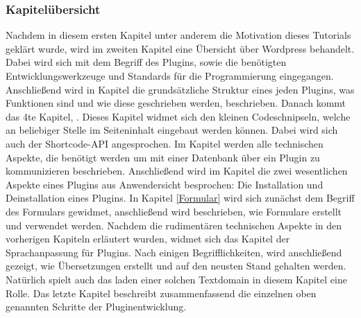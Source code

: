 \subsubsection{Kapitelübersicht}
Nachdem in diesem ersten Kapitel  unter anderem die Motivation dieses Tutorials geklärt wurde, wird im  zweiten Kapitel  eine Übersicht über Wordpress behandelt. Dabei wird sich mit dem Begriff des Plugins, sowie die benötigten Entwicklungswerkzeuge und Standards für die Programmierung eingegangen.\newline
Anschließend wird in Kapitel  die grundsätzliche Struktur eines jeden Plugins, was Funktionen sind und wie diese geschrieben werden, beschrieben.\newline
Danach kommt das 4te Kapitel, . Dieses Kapitel widmet sich den kleinen Codeschnipseln, welche an beliebiger Stelle im Seiteninhalt eingebaut werden können. Dabei wird sich auch der Shortcode-API angesprochen.\newline
Im Kapitel  werden alle technischen Aspekte, die benötigt werden um mit einer Datenbank über ein Plugin zu kommunizieren beschrieben.\newline
Anschließend wird im Kapitel  die zwei wesentlichen Aspekte eines Plugins aus Anwendersicht besprochen: Die Installation und Deinstallation eines Plugins.\newline
In Kapitel \ref{Formular} wird sich zunächst dem Begriff des Formulars gewidmet, anschließend wird beschrieben, wie Formulare erstellt und verwendet werden.\newline
Nachdem die rudimentären technischen Aspekte in den vorherigen Kapiteln erläutert wurden, widmet sich das Kapitel  der Sprachanpassung für Plugins. Nach einigen Begrifflichkeiten, wird anschließend gezeigt, wie Übersetzungen erstellt und auf den neusten Stand gehalten werden. Natürlich spielt auch das laden einer solchen Textdomain in diesem Kapitel eine Rolle.\newline
Das letzte Kapitel  beschreibt zusammenfassend die einzelnen oben genannten Schritte der Pluginentwicklung. 
